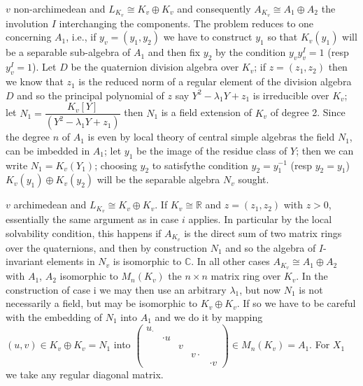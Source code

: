 \setcounter{lem}{1}
\begin{lem}%
\setcounter{romancase}{0}
\begin{romancase} %
$v$ non-archimedean and $L_{K_v} \cong K_v \oplus K_v$ and consequently
  $A_{K_v}\cong A_1 \oplus A_2$ the involution $I$ interchanging the
  components. The problem reduces to one concerning $A_1$, i.e., if
  $y_v = (y_1, y_2)$ we have to construct $y_1$ so that $K_v (y_1)$
  will be a separable sub-algebra of $A_1$ and then fix $y_2$ by the
  condition $y_v y^I_v = 1$ (resp $y^I_v = 1$). Let $D$ be the
  quaternion division algebra over $K_v$; if $z = (z_1, z_2)$ then we
  know that $z_1$ is the reduced norm of a regular element of the
  division algebra $D$ and so the principal polynomial of $z$ say $Y^2
  - \lambda_1 Y + z_1$ is irreducible over $K_v$; let $N_1 =
  \dfrac{K_v [Y]}{(Y^2 - \lambda_1 Y+z_1)}$ then $N_1$ is a field
  extension of $K_v$ of degree 2. Since the degree $n$ of $A_1$ is
  even by local theory of central simple algebras the field $N_1$,  can
  be imbedded in $A_1$; let $y_1$ be the image of the residue class of
  $Y$; then we can write $N_1 = K_v(Y_1)$; choosing $y_2$ to
  satisfy\pageoriginale the condition $y_2 = y^{-1}_1$ (resp $y_2 =
  y_1$) $K_v (y_1) \oplus K_v (y_2)$ will be the separable algebra $N_v$
  sought.  
\end{romancase}
\end{lem}


\begin{romancase} %
$v$ archimedean and $L_{K_v} \cong K_v \oplus K_v$. If $K_v \cong
  \mathbb{R}$ and $z = (z_1, z_2)$ with $z > 0$, essentially the same
  argument as in case $i$ applies. In particular by the local
  solvability condition, this happens if $A_{K_v}$ is the direct sum
  of two matrix rings over the quaternions, and then by construction
  $N_1$ and so the algebra of $I$-invariant elements in $N_v$ is
  isomorphic to $\mathbb{C}$. In all other cases $A_{K_v} \cong A_1
  \oplus A_2$ with $A_1$, $A_2$ isomorphic to $M_n (K_v)$ the $n \times
  n$ matrix ring over $K_v$. In the construction of case i we may
  then use an arbitrary $\lambda_1$, but now $N_1$ is not necessarily a
  field, but may be isomorphic to $K_v \oplus K_v$. If so we have to
  be careful with the embedding of $N_1$ into $A_1$ and we do it by
  mapping $(u, v) \in K_v \oplus K_v = N_1$ into $\left(\begin{smallmatrix} 
u_\cdot & & & &  \\
& \cdot u & & & \\
& & v & & \\
& & & v\cdot & \\
& & & & \cdot v
 \end{smallmatrix}  \right)\in M_n (K_v) =
  A_1$. For $X_1$ we take any regular diagonal matrix. 
\end{romancase}

